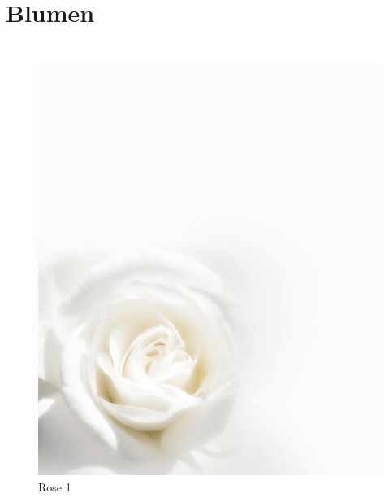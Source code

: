 \documentclass[ngerman,a4paper,11pt]{scrreprt}
\begin{document}
\chapter{Blumen}
\label{sec-3-2}

\begin{figure}[H]
\centering
\includegraphics[width=\textwidth,height=.8\textheight]{Bilder/Bilder/750_0010_8422_Hintergrund_weisse_Rose_Todesanzeige.png}
\caption{Rose 1}
\end{figure}
\end{document}
